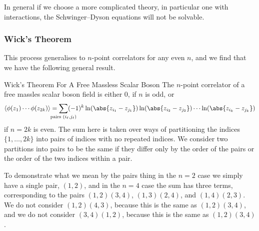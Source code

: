 \documentclass[fleqn]{NotesClass}
\DeclarePairedDelimiter{\correlator}{\langle}{\rangle}
\begin{document}
    In general if we choose a more complicated theory, in particular one with interactions, the Schwinger--Dyson equations will not be solvable.
    
    \subsubsection{Wick's Theorem}
    This process generalises to \(n\)-point correlators for any even \(n\), and we find that we have the following general result.
    
    \begin{thm}{Wick's Theorem For A Free Massless Scalar Boson}{}
        The \(n\)-point correlator of a free massles scalar boson field is either 0, if \(n\) is odd, or
        \begin{equation*}
            \correlator{\phi(z_1) \dotsm \phi(z_{2k})} = \sum_{\mathclap{\text{pairs } (i_\ell, j_{\ell})}} (-1)^k \ln(\abs{z_{i_1} - z_{j_1}}) \ln(\abs{z_{i_2} - z_{j_2}}) \dotsm \ln(\abs{z_{i_k} - z_{j_k}})
        \end{equation*}
        if \(n = 2k\) is even.
        The sum here is taken over ways of partitioning the indices \(\{1, \dotsc, 2k\}\) into pairs of indices with no repeated indices.
        We consider two partitions into pairs to be the same if they differ only by the order of the pairs or the order of the two indices within a pair.
    \end{thm}
    
    To demonstrate what we mean by the pairs thing in the \(n = 2\) case we simply have a single pair, \((1, 2)\), and in the \(n = 4\) case the sum has three terms, corresponding to the pairs \((1, 2)(3, 4)\), \((1, 3)(2, 4)\), and \((1, 4)(2, 3)\).
    We do not consider \((1, 2)(4, 3)\), because this is the same as \((1, 2)(3, 4)\), and we do not consider \((3, 4)(1, 2)\), because this is the same as \((1, 2)(3, 4)\).
    
\end{document}
